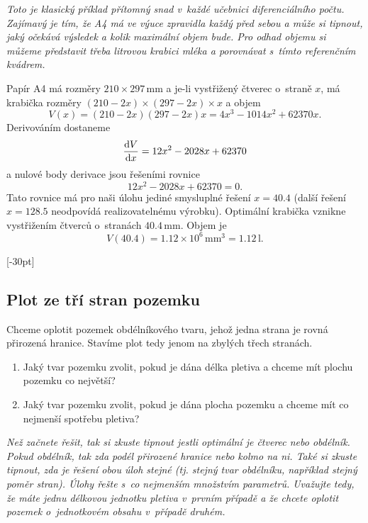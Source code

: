 \textit{Toto je klasický příklad přítomný snad v každé učebnici diferenciálního počtu. Zajímavý je tím, že A4 má ve výuce zpravidla každý před sebou a může si tipnout, jaký očekává výsledek a kolik maximální objem bude. Pro odhad objemu si můžeme představit třeba litrovou krabici mléka a porovnávat s tímto referenčním kvádrem.}



\reseni Papír A4 má rozměry $210\times 297\,\mathrm{mm}$ a je-li vystřižený čtverec o straně $x$, má krabička rozměry $(210-2x)\times(297-2x)\times x$ a objem
\begin{equation*}
V(x)=(210-2x)(297-2x)x=4 x^3 - 1014 x^2 + 62370 x.
\end{equation*}
Derivováním dostaneme
\begin{equation*}
  \frac{\mathrm{d}V}{\mathrm{d}x} = 12x^2 - 2028x + 62370
\end{equation*}
a nulové body derivace jsou řešeními rovnice 
\begin{equation*}
   12x^2 - 2028x + 62370 = 0.
 \end{equation*}
 Tato rovnice má pro naši úlohu jediné smysluplné řešení $x=40.4$ (další řešení $x=128.5$ neodpovídá realizovatelnému výrobku). Optimální krabička vznikne vystřižením čtverců o stranách $40.4\,\mathrm{mm}$. Objem je
 \begin{equation*}
   V(40.4)=1.12 \times 10^6\,\mathrm {mm}^3=1.12\,\mathrm{l}.
 \end{equation*}
 \konec

 
[-30pt] \subsection{Plot ze tří stran pozemku}  Chceme oplotit
pozemek obdélníkového tvaru, jehož jedna strana je rovná přirozená
hranice. Stavíme plot tedy jenom na zbylých třech stranách.
\begin{enumerate}[(1)] pt
\item Jaký tvar pozemku zvolit, pokud je dána délka pletiva a chceme mít plochu pozemku co největší?
\item Jaký tvar pozemku zvolit, pokud je dána plocha pozemku a chceme mít co nejmenší spotřebu pletiva?
\end{enumerate}


\textit{Než začnete řešit, tak si zkuste tipnout jestli optimální je čtverec
nebo obdélník. Pokud obdélník, tak zda podél přirozené hranice nebo
kolmo na ni. Také si zkuste tipnout, zda je řešení obou úloh stejné
(tj. stejný tvar obdélníku, například stejný poměr stran). Úlohy řešte
s co nejmenším množstvím parametrů. Uvažujte tedy, že máte jednu
délkovou jednotku pletiva v~prvním případě a že chcete oplotit pozemek
o jednotkovém obsahu v~případě druhém.
}

